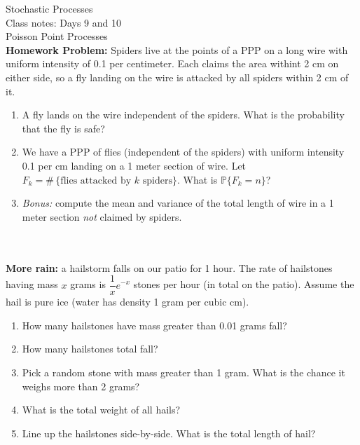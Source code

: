 \documentclass[a4paper, 12pt]{article}
\begin{document}
\large
Stochastic Processes\\
Class notes: Days 9 and 10\\
Poisson Point Processes\\


\textbf{Homework Problem:} Spiders live at the points of a PPP on a long wire with uniform intensity of 0.1 per centimeter. Each claims the area withint 2 cm on either side, so a fly landing on the wire is attacked by all spiders within 2 cm of it.

\begin{enumerate}
\item A fly lands on the wire independent of the spiders. What is the probability that the fly is safe?

\item We have a PPP of flies (independent of the spiders) with uniform intensity 0.1 per cm landing on a 1 meter section of wire. Let $F_k=\#\,\{\textrm{flies attacked by $k$ spiders}\}$. What is $\mathbb{P}\{F_k=n\}$?

\item \emph{Bonus:} compute the mean and variance of the total length of wire in a 1 meter section \emph{not} claimed by spiders.
\end{enumerate}

\hrulefill\\\\

\textbf{More rain:} a hailstorm falls on our patio for 1 hour. The rate of hailstones having mass $x$ grams is $\dfrac{1}{x}e^{-x}$ stones per hour (in total on the patio). Assume the hail is pure ice (water has density 1 gram per cubic cm).

\begin{enumerate}
\item How many hailstones have mass greater than 0.01 grams fall?

\item How many hailstones total fall?

\item Pick a random stone with mass greater than 1 gram. What is the chance it weighs more than 2 grams?

\item What is the total weight of all hails?

\item Line up the hailstones side-by-side. What is the total length of hail?
\end{enumerate}
\end{document}
